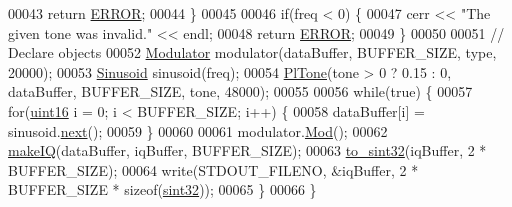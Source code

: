 \begin{DoxyCode}
00043         \textcolor{keywordflow}{return} \hyperlink{definitions_8hpp_a8fe83ac76edc595f6b98cd4a4127aed5}{ERROR};
00044     \}
00045 
00046     \textcolor{keywordflow}{if}(freq < 0) \{
00047         cerr << \textcolor{stringliteral}{"The given tone was invalid."} << endl;
00048         \textcolor{keywordflow}{return} \hyperlink{definitions_8hpp_a8fe83ac76edc595f6b98cd4a4127aed5}{ERROR};
00049     \}
00050 
00051     \textcolor{comment}{// Declare objects}
00052     \hyperlink{classradio_1_1Modulator}{Modulator} modulator(dataBuffer, BUFFER\_SIZE, type, 20000);
00053     \hyperlink{classradio_1_1Sinusoid}{Sinusoid} sinusoid(freq);
00054     \hyperlink{classradio_1_1PlTone}{PlTone}(tone > 0 ? 0.15 : 0, dataBuffer, BUFFER\_SIZE, tone, 48000);
00055 
00056     \textcolor{keywordflow}{while}(\textcolor{keyword}{true}) \{
00057         \textcolor{keywordflow}{for}(\hyperlink{definitions_8hpp_a05f6b0ae8f6a6e135b0e290c25fe0e4e}{uint16} i = 0; i < BUFFER\_SIZE; i++) \{
00058             dataBuffer[i] = sinusoid.\hyperlink{classradio_1_1Sinusoid_aab44298ea1bd5cb175d5826243cf56f2}{next}();
00059         \}
00060 
00061         modulator.\hyperlink{classradio_1_1Modulator_ab5eac6e4900579486b5871b48e64cdab}{Mod}();
00062         \hyperlink{namespaceradio_a7166522e76ff88e8d482491b1b6e2275}{makeIQ}(dataBuffer, iqBuffer, BUFFER\_SIZE);
00063         \hyperlink{namespaceradio_ae4b2334c4366dcdf0311ad79d2067945}{to\_sint32}(iqBuffer, 2 * BUFFER\_SIZE);
00064         write(STDOUT\_FILENO, &iqBuffer,  2 * BUFFER\_SIZE * \textcolor{keyword}{sizeof}(\hyperlink{definitions_8hpp_a0573de65958b4fda3a0460ed417dafb8}{sint32}));
00065     \}
00066 \}
\end{DoxyCode}

